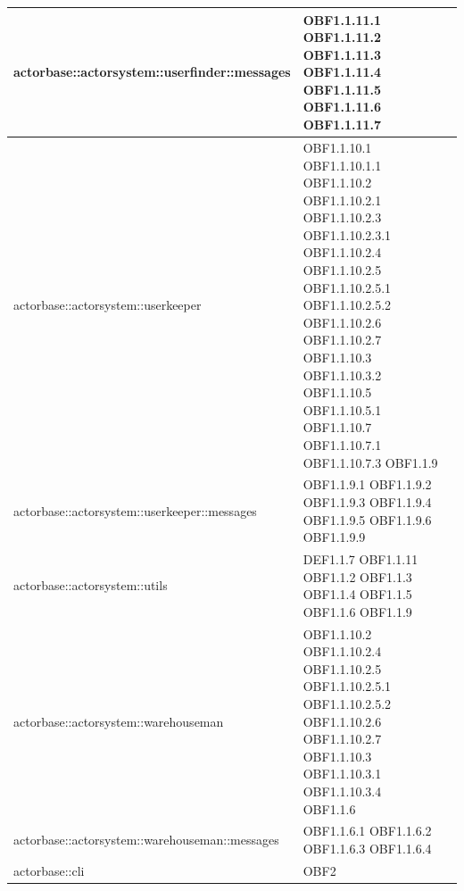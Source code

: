\documentclass{scalatekids-article}
\begin{document}
\begin{longtable}[H]{|p{9cm}|p{8cm}|}
\hline
actorbase::actorsystem::userfinder::messages & \multiLineCell[t]{OBF1.1.11.1 OBF1.1.11.2\\OBF1.1.11.3 OBF1.1.11.4\\OBF1.1.11.5 OBF1.1.11.6\\OBF1.1.11.7\\}\\
\hline
actorbase::actorsystem::userkeeper & \multiLineCell[t]{OBF1.1.10.1 OBF1.1.10.1.1\\OBF1.1.10.2 OBF1.1.10.2.1\\OBF1.1.10.2.3 OBF1.1.10.2.3.1\\OBF1.1.10.2.4 OBF1.1.10.2.5\\OBF1.1.10.2.5.1 OBF1.1.10.2.5.2\\OBF1.1.10.2.6 OBF1.1.10.2.7\\OBF1.1.10.3 OBF1.1.10.3.2\\OBF1.1.10.5 OBF1.1.10.5.1\\OBF1.1.10.7 OBF1.1.10.7.1\\OBF1.1.10.7.3 OBF1.1.9\\}\\
\hline
actorbase::actorsystem::userkeeper::messages & \multiLineCell[t]{OBF1.1.9.1 OBF1.1.9.2\\OBF1.1.9.3 OBF1.1.9.4\\OBF1.1.9.5 OBF1.1.9.6\\OBF1.1.9.9}\\
\hline
actorbase::actorsystem::utils & \multiLineCell[t]{DEF1.1.7 OBF1.1.11\\OBF1.1.2 OBF1.1.3\\OBF1.1.4 OBF1.1.5\\OBF1.1.6 OBF1.1.9\\}\\
\hline
actorbase::actorsystem::warehouseman & \multiLineCell[t]{OBF1.1.10.2 OBF1.1.10.2.4\\OBF1.1.10.2.5 OBF1.1.10.2.5.1\\OBF1.1.10.2.5.2 OBF1.1.10.2.6\\OBF1.1.10.2.7 OBF1.1.10.3\\OBF1.1.10.3.1 OBF1.1.10.3.4\\OBF1.1.6\\}\\
\hline
actorbase::actorsystem::warehouseman::messages & \multiLineCell[t]{OBF1.1.6.1 OBF1.1.6.2\\OBF1.1.6.3 OBF1.1.6.4\\}\\
\hline
actorbase::cli & \multiLineCell[t]{OBF2\\}\\

\end{longtable}
\end{document}
